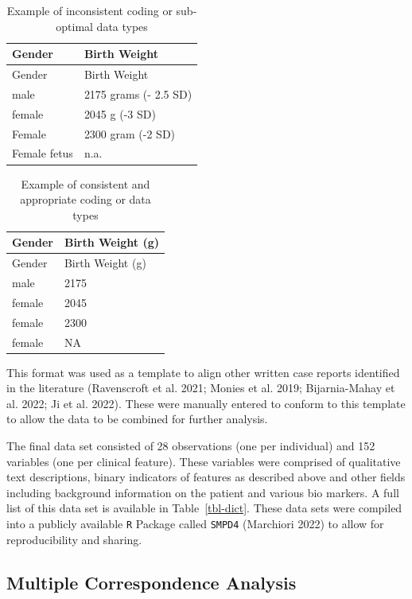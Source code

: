 \documentclass[
  letterpaper,
  DIV=11,
  numbers=noendperiod]{scrartcl}
\begin{document}
\hypertarget{tbl-data-types}{}
\begin{longtable}[]{@{}ll@{}}
\caption{\label{tbl-data-types}Example of inconsistent coding or
sub-optimal data types}\tabularnewline
\toprule()
Gender & Birth Weight \\
\midrule()
\endfirsthead
\toprule()
Gender & Birth Weight \\
\midrule()
\endhead
male & 2175 grams (- 2.5 SD) \\
female & 2045 g (-3 SD) \\
Female & 2300 gram (-2 SD) \\
Female fetus & n.a. \\
\bottomrule()
\end{longtable}

\hypertarget{tbl-data-types2}{}
\begin{longtable}[]{@{}ll@{}}
\caption{\label{tbl-data-types2}Example of consistent and appropriate
coding or data types}\tabularnewline
\toprule()
Gender & Birth Weight (g) \\
\midrule()
\endfirsthead
\toprule()
Gender & Birth Weight (g) \\
\midrule()
\endhead
male & 2175 \\
female & 2045 \\
female & 2300 \\
female & NA \\
\bottomrule()
\end{longtable}

This format was used as a template to align other written case reports
identified in the literature (Ravenscroft et al. 2021; Monies et al.
2019; Bijarnia-Mahay et al. 2022; Ji et al. 2022). These were manually
entered to conform to this template to allow the data to be combined for
further analysis.

The final data set consisted of 28 observations (one per individual) and
152 variables (one per clinical feature). These variables were comprised
of qualitative text descriptions, binary indicators of features as
described above and other fields including background information on the
patient and various bio markers. A full list of this data set is
available in Table~\ref{tbl-dict}. These data sets were compiled into a
publicly available \texttt{R} Package called \texttt{SMPD4} (Marchiori
2022) to allow for reproducibility and sharing.

\hypertarget{multiple-correspondence-analysis}{%
\subsection{Multiple Correspondence
Analysis}\label{multiple-correspondence-analysis}}
\end{document}
